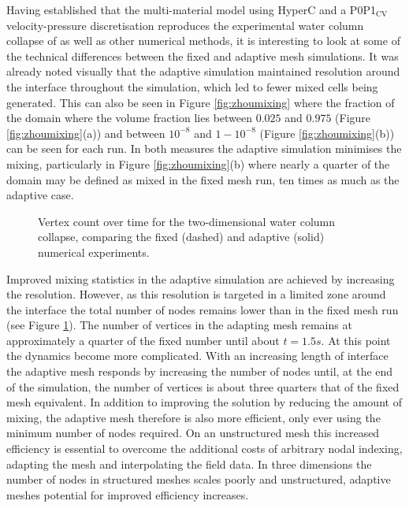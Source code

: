 Having established that the multi-material model using HyperC and a P0P1$_{\text{CV}}$ velocity-pressure discretisation reproduces the experimental water column collapse of \citet{zhou_nonlinear_1999} as well as other numerical methods, it is interesting to look at some of the technical differences between the fixed and adaptive mesh simulations.  It was already noted visually that the adaptive simulation maintained resolution around the interface throughout the simulation, which led to fewer mixed cells being generated.  This can also be seen in Figure \ref{fig:zhoumixing} where the fraction of the domain where the volume fraction lies between $0.025$ and $0.975$ (Figure \ref{fig:zhoumixing}(a)) and between $10^{-8}$ and $1-10^{-8}$ (Figure \ref{fig:zhoumixing}(b)) can be seen for each run.  In both measures the adaptive simulation minimises the mixing, particularly in Figure \ref{fig:zhoumixing}(b) where nearly a quarter of the domain may be defined as mixed in the fixed mesh run, ten times as much as the adaptive case.

\begin{figure}[btp]
\begin{center}

\caption{Vertex count over time for the two-dimensional water column collapse, comparing the fixed (dashed) and adaptive (solid) numerical experiments.}
\label{fig:zhounodes}
\end{center}
\end{figure}

Improved mixing statistics in the adaptive simulation are achieved by increasing the resolution.  However, as this resolution is targeted in a limited zone around the interface the total number of nodes remains lower than in the fixed mesh run (see Figure \ref{fig:zhounodes}).  The number of vertices in the adapting mesh remains at approximately a quarter of the fixed number until about $t=1.5s$.  At this point the dynamics become more complicated.  With an increasing length of interface the adaptive mesh responds by increasing the number of nodes until, at the end of the simulation, the number of vertices is about three quarters that of the fixed mesh equivalent.  In addition to improving the solution by reducing the amount of mixing, the adaptive mesh therefore is also more efficient, only ever using the minimum number of nodes required.  On an unstructured mesh this increased efficiency is essential to overcome the additional costs of arbitrary nodal indexing, adapting the mesh and interpolating the field data.  In three dimensions the number of nodes in structured meshes scales poorly and unstructured, adaptive meshes potential for improved efficiency increases.
